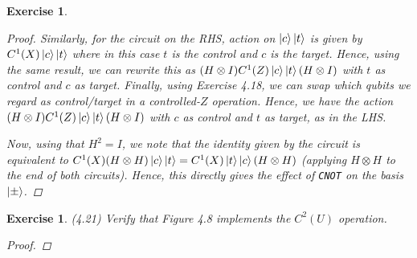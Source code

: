 \documentclass[11pt]{article}
\newcommand\0{\mathbf{0}}
\newcommand\<{\langle}
\renewcommand\>{\rangle}
\newtheorem{exercise}[theorem]{Exercise}
\begin{document}
\begin{exercise}
\begin{proof}
Similarly, for the circuit on the RHS, action on $\ket{c}\ket{t}$ is given by $C^1(X)\ket{c}\ket{t}$ where in this case $t$ is the control and $c$ is the target. Hence, using the same result, we can rewrite this as $(H \otimes I) C^1(Z)\ket{c}\ket{t} (H \otimes I)$ with $t$ as control and $c$ as target. Finally, using Exercise 4.18, we can swap which qubits we regard as control/target in a controlled-$Z$ operation. Hence, we have the action $(H \otimes I) C^1(Z)\ket{c}\ket{t} (H \otimes I)$ with $c$ as control and $t$ as target, as in the LHS. 

Now, using that $H^2 = I$, we note that the identity given by the circuit is equivalent to $C^1(X) (H \otimes H)\ket{c}\ket{t} = C^1(X) \ket{t}\ket{c} (H \otimes H)$ (applying $H \otimes H$ to the end of both circuits). Hence, this directly gives the effect of \texttt{CNOT} on the basis $\ket{\pm}$. 

\end{proof}

\end{exercise}

\begin{exercise}(4.21) Verify that Figure 4.8 implements the $C^2(U)$ operation.
	
	\begin{proof}
		
	\end{proof}

\end{exercise}
\end{document}
